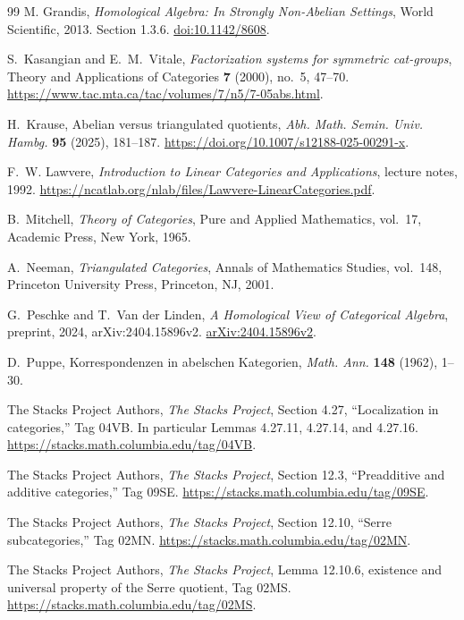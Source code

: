 \documentclass[11pt,reqno,a4paper]{amsart}
\theoremstyle{definition}
\theoremstyle{remark}
\newcommand{\0}{\mathbf{0}}
\renewcommand{\1}{\mathbf{1}}
\begin{document}
\begin{thebibliography}{99}
M. Grandis,
\emph{Homological Algebra: In Strongly Non-Abelian Settings},
World Scientific, 2013. Section 1.3.6.
\href{https://doi.org/10.1142/8608}{doi:10.1142/8608}.

S.~Kasangian and E.~M.~Vitale,
\emph{Factorization systems for symmetric cat-groups},
Theory and Applications of Categories \textbf{7} (2000),
no.~5, 47--70.
\url{https://www.tac.mta.ca/tac/volumes/7/n5/7-05abs.html}.

H.~Krause,
Abelian versus triangulated quotients,
\emph{Abh. Math. Semin. Univ. Hambg.} \textbf{95} (2025), 181--187.
\url{https://doi.org/10.1007/s12188-025-00291-x}.

F.~W. Lawvere,
\emph{Introduction to Linear Categories and Applications},
lecture notes, 1992.
\url{https://ncatlab.org/nlab/files/Lawvere-LinearCategories.pdf}.

B.~Mitchell,
\emph{Theory of Categories},
Pure and Applied Mathematics, vol.~17, Academic Press, New York, 1965.

A.~Neeman,
\emph{Triangulated Categories},
Annals of Mathematics Studies, vol.~148, Princeton University Press,
Princeton, NJ, 2001.

G.~Peschke and T.~Van der Linden,
\emph{A Homological View of Categorical Algebra},
preprint, 2024, arXiv:2404.15896v2.
\href{https://arxiv.org/abs/2404.15896v2}
{arXiv:2404.15896v2}.

D.~Puppe,
Korrespondenzen in abelschen Kategorien,
\emph{Math. Ann.} \textbf{148} (1962), 1--30.

The Stacks Project Authors,
\emph{The Stacks Project}, Section 4.27,
``Localization in categories,'' Tag 04VB.
In particular Lemmas 4.27.11, 4.27.14, and 4.27.16.
\url{https://stacks.math.columbia.edu/tag/04VB}.

The Stacks Project Authors,
\emph{The Stacks Project}, Section 12.3,
``Preadditive and additive categories,'' Tag 09SE.
\url{https://stacks.math.columbia.edu/tag/09SE}.

The Stacks Project Authors,
\emph{The Stacks Project}, Section 12.10,
``Serre subcategories,'' Tag 02MN.
\url{https://stacks.math.columbia.edu/tag/02MN}.

The Stacks Project Authors,
\emph{The Stacks Project}, Lemma 12.10.6,
existence and universal property of the Serre quotient, Tag 02MS.
\url{https://stacks.math.columbia.edu/tag/02MS}.


\end{thebibliography}
\end{document}
